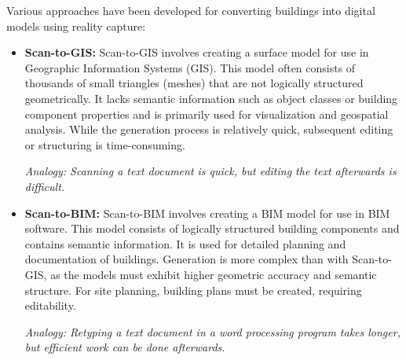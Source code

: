 \begin{English}
    Various approaches have been developed for converting buildings into digital models using reality capture:

    \begin{itemize}
        \item \textbf{Scan-to-GIS:} Scan-to-GIS involves creating a surface model for use in Geographic Information Systems (GIS). This model often consists of thousands of small triangles (meshes) that are not logically structured geometrically. It lacks semantic information such as object classes or building component properties and is primarily used for visualization and geospatial analysis. While the generation process is relatively quick, subsequent editing or structuring is time-consuming.
        
        \textit{Analogy: Scanning a text document is quick, but editing the text afterwards is difficult.}

        \item \textbf{Scan-to-BIM:} Scan-to-BIM involves creating a BIM model for use in BIM software. This model consists of logically structured building components and contains semantic information. It is used for detailed planning and documentation of buildings. Generation is more complex than with Scan-to-GIS, as the models must exhibit higher geometric accuracy and semantic structure. For site planning, building plans must be created, requiring editability.
        
        \textit{Analogy: Retyping a text document in a word processing program takes longer, but efficient work can be done afterwards.}
    \end{itemize}
\end{English}

